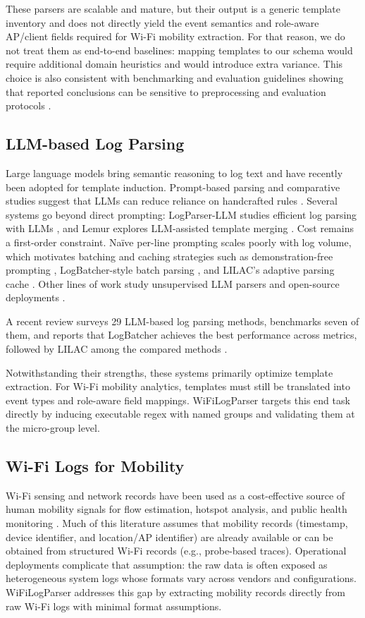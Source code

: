 \documentclass[journal]{IEEEtran}
\begin{document}
These parsers are scalable and mature, but their output is a generic template inventory and does not directly yield the event semantics and role-aware AP/client fields required for Wi-Fi mobility extraction. For that reason, we do not treat them as end-to-end baselines: mapping templates to our schema would require additional domain heuristics and would introduce extra variance. This choice is also consistent with benchmarking and evaluation guidelines showing that reported conclusions can be sensitive to preprocessing and evaluation protocols \cite{ref22,ref45,ref46}.

\subsection{LLM-based Log Parsing}
Large language models bring semantic reasoning to log text and have recently been adopted for template induction. Prompt-based parsing and comparative studies suggest that LLMs can reduce reliance on handcrafted rules \cite{ref31,ref33,ref54,ref52}. Several systems go beyond direct prompting: LogParser-LLM studies efficient log parsing with LLMs \cite{ref26}, and Lemur explores LLM-assisted template merging \cite{ref34}. Cost remains a first-order constraint. Na\"ive per-line prompting scales poorly with log volume, which motivates batching and caching strategies such as demonstration-free prompting \cite{ref37}, LogBatcher-style batch parsing \cite{ref32}, and LILAC's adaptive parsing cache \cite{ref30}. Other lines of work study unsupervised LLM parsers and open-source deployments \cite{ref53,ref35}.

A recent review surveys 29 LLM-based log parsing methods, benchmarks seven of them, and reports that LogBatcher achieves the best performance across metrics, followed by LILAC among the compared methods \cite{ref44}.

Notwithstanding their strengths, these systems primarily optimize template extraction. For Wi-Fi mobility analytics, templates must still be translated into event types and role-aware field mappings. WiFiLogParser targets this end task directly by inducing executable regex with named groups and validating them at the micro-group level.

\subsection{Wi-Fi Logs for Mobility}
Wi-Fi sensing and network records have been used as a cost-effective source of human mobility signals for flow estimation, hotspot analysis, and public health monitoring \cite{ref1,ref4,ref9,ref3}. Much of this literature assumes that mobility records (timestamp, device identifier, and location/AP identifier) are already available or can be obtained from structured Wi-Fi records (e.g., probe-based traces). Operational deployments complicate that assumption: the raw data is often exposed as heterogeneous system logs whose formats vary across vendors and configurations. WiFiLogParser addresses this gap by extracting mobility records directly from raw Wi-Fi logs with minimal format assumptions.
\end{document}
